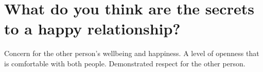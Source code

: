 \section{What do you think are the secrets to a happy relationship?}
Concern for the other person's wellbeing and happiness.
A level of openness that is comfortable with both people.
Demonstrated respect for the other person.




